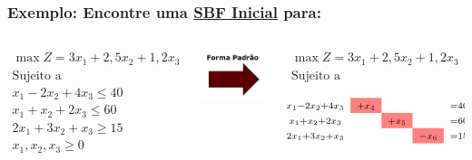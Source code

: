 \begin{frame}
	\frametitle{Exemplo: Encontre uma {\color{red}\underline{SBF Inicial}} para:}
	\begin{columns}
		\begin{column}{0.3\textwidth}
			\begin{equation*}
				\begin{matrix}
					\scriptstyle \max Z = 3x_1 + 2,5x_2 + 1,2x_3 \\
					\scriptstyle \text{Sujeito a} \\
					\scriptstyle x_1 - 2x_2 + 4x_3 \le 40 \\
					\scriptstyle x_1 + x_2 + 2x_3 \le 60 \\
					\scriptstyle 2x_1 + 3x_2 + x_3 \ge 15 \\
					\scriptstyle x_1, x_2, x_3 \ge 0 \\
				\end{matrix}
			\end{equation*} \pause
		\end{column}
		\begin{column}{0.15\textwidth}
			\includegraphics[width=2cm,height=1.5cm]{SetaFormaPadrao.png}
		\end{column}		
		\begin{column}{0.55\textwidth}
			\begin{mdframed}[backgroundcolor=yellow]
				\begin{equation*}
					\begin{matrix}
						\scriptstyle \max Z = 3x_1 + 2,5x_2 + 1,2x_3 \\
						\scriptstyle \text{Sujeito a} \\
					\end{matrix}
				\end{equation*}
				\only<2>
				{
					\begin{equation*}			
					\begin{matrix}
						\scriptstyle x_1 - 2x_2 + 4x_3 & \cellcolor{red!50} \scriptstyle+x_4 & & & \scriptstyle = 40 \\
						\scriptstyle x_1 + x_2 + 2x_3  & & \cellcolor{red!50} \scriptstyle+x_5 & & \scriptstyle = 60 \\
						\scriptstyle 2x_1 + 3x_2 + x_3 & & & \cellcolor{red!50} \scriptstyle-x_6 & \scriptstyle = 15 \\

\end{matrix}
\end{equation*}}
\end{mdframed}
\end{column}
\end{columns}
\end{frame}
